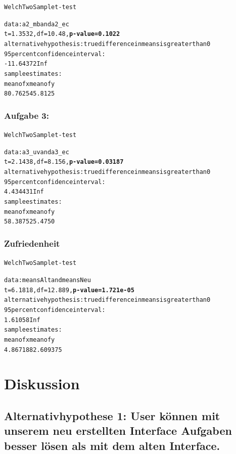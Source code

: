 \documentclass[a4paper,10pt]{scrartcl}
\begin{document}
\begin{alltt}
Welch Two Sample t-test

data:  a2_mb and a2_ec 
t = 1.3532, df = 10.48, \textbf{p-value = 0.1022}
alternative hypothesis: true difference in means is greater than 0 
95 percent confidence interval:
 -11.64372       Inf 
sample estimates:
mean of x mean of y 
  80.7625   45.8125 
\end{alltt} 

\subsubsection*{Aufgabe 3:}

\begin{alltt}
Welch Two Sample t-test

data:  a3_uv and a3_ec 
t = 2.1438, df = 8.156, \textbf{p-value = 0.03187}
alternative hypothesis: true difference in means is greater than 0 
95 percent confidence interval:
 4.434431      Inf 
sample estimates:
mean of x mean of y 
  58.3875   25.4750 
\end{alltt} 

\subsubsection*{Zufriedenheit} 

\begin{alltt}
Welch Two Sample t-test

data:  meansAlt and meansNeu 
t = 6.1818, df = 12.889, \textbf{p-value = 1.721e-05}
alternative hypothesis: true difference in means is greater than 0 
95 percent confidence interval:
 1.61058     Inf 
sample estimates:
mean of x mean of y 
 4.867188  2.609375 
\end{alltt} 

\section{Diskussion}

\subsection{Alternativhypothese 1:  User können mit unserem neu erstellten Interface Aufgaben besser lösen als mit dem alten Interface.}
\end{document}
